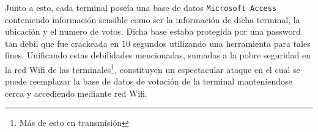Junto a esto, cada terminal poseía una base de datos \texttt{Microsoft Access} conteniendo información sensible como ser la información de dicha terminal, la ubicación y el numero de votos. Dicha base estaba protegida por una password tan debil que fue crackeada en 10 segundos utilizando una herramienta para tales fines.
Unificando estas debilidades mencionadas, sumadas a la pobre seguridad en la red Wifi de las terminales\footnote{Más de esto en transmisión}, constituyen un espectacular ataque en el cual se puede reemplazar la base de datos de votación de la terminal manteniendose cerca y accediendo mediante red Wifi\cite{schneier}.

